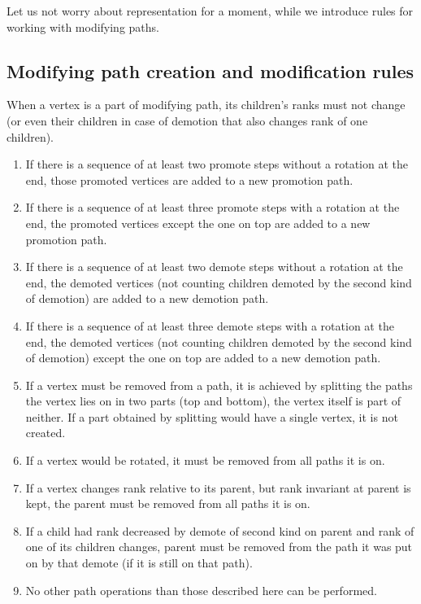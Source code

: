 Let us not worry about representation for a moment, while we introduce rules for working with modifying paths.

\subsection{Modifying path creation and modification rules}

When a vertex is a part of modifying path, its children's ranks must not change (or even their children in case of demotion that also changes rank of one children). 

\begin{enumerate}

\item If there is a sequence of at least two promote steps without a rotation at the end, those promoted vertices are added to a new promotion path. 

\item If there is a sequence of at least three promote steps with a rotation at the end, the promoted vertices except the one on top are added to a new promotion path.

\item If there is a sequence of at least two demote steps without a rotation at the end, the demoted vertices (not counting children demoted by the second kind of demotion) are added to a new demotion path.

\item If there is a sequence of at least three demote steps with a rotation at the end, the demoted vertices (not counting children demoted by the second kind of demotion) except the one on top are added to a new demotion path.

\item If a vertex must be removed from a path, it is achieved by splitting the paths the vertex lies on in two parts (top and bottom), the vertex itself is part of neither. If a part obtained by splitting would have a single vertex, it is not created.

\item If a vertex would be rotated, it must be removed from all paths it is on.

\item If a vertex changes rank relative to its parent, but rank invariant at parent is kept, the parent must be removed from all paths it is on.

\item If a child had rank decreased by demote of second kind on parent and rank of one of its children changes, parent must be removed from the path it was put on by that demote (if it is still on that path).

\item No other path operations than those described here can be performed.

\end{enumerate}

